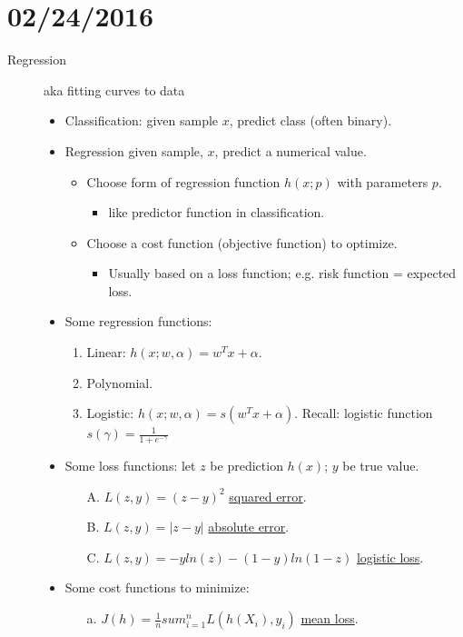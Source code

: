 \documentclass[10pt]{article}
\begin{document}
\section*{02/24/2016}
\begin{description}
	\item[Regression] aka fitting curves to data
	\begin{itemize}
		\item Classification: given sample $x$, predict class (often binary).
		\item Regression given sample, $x$, predict a numerical value.
		\begin{itemize}
			\item Choose form of regression function $h(x;p)$ with parameters $p$.
			\begin{itemize}
				\item like predictor function in classification.
			\end{itemize}
			\item Choose a cost function (objective function) to optimize.
			\begin{itemize}
				\item Usually based on a loss function; e.g. risk function = expected loss.
			\end{itemize}
		\end{itemize}
		\item Some regression functions:
			\begin{enumerate}
				\item Linear: $h(x; w, \alpha) = w^{T}x + \alpha$.
				\item Polynomial.
				\item Logistic: $h(x; w, \alpha) = s(w^{T}x + \alpha)$. Recall: logistic function $s(\gamma) = \frac{1}{1 + e^{-\gamma}}$
			\end{enumerate}
		\item Some loss functions: let $z$ be prediction $h(x)$; $y$ be true value.
			\begin{enumerate}
				\item[A.] $L(z, y) = (z-y)^{2}$ \underline{squared error}.
				\item[B.] $L(z, y) = |z-y|$ \underline{absolute error}.
				\item[C.] $L(z, y) = -yln(z)-(1-y)ln(1-z)$ \underline{logistic loss}.
			\end{enumerate}
		\item Some cost functions to minimize:
			\begin{enumerate}
				\item[a.] $J(h) = \frac{1}{n}sum_{i=1}^{n}L(h(X_{i}),y_{i})$ \underline{mean loss}.

\end{enumerate}
\end{itemize}
\end{description}
\end{document}
